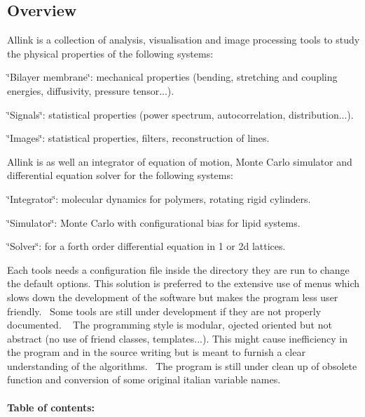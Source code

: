\hypertarget{index_Overview_section}{}\subsection{Overview}\label{index_Overview_section}
Allink is a collection of analysis, visualisation and image processing tools to study the physical properties of the following systems\+: 
\begin{DoxyItemize}
\item \char`\"{}\+Bilayer membrane\char`\"{}\+: mechanical properties (bending, stretching and coupling energies, diffusivity, pressure tensor...). 
\item \char`\"{}\+Signals\char`\"{}\+: statistical properties (power spectrum, autocorrelation, distribution...). 
\item \char`\"{}\+Images\char`\"{}\+: statistical properties, filters, reconstruction of lines. 
\end{DoxyItemize}Allink is as well an integrator of equation of motion, Monte Carlo simulator and differential equation solver for the following systems\+: 
\begin{DoxyItemize}
\item \char`\"{}\+Integrator\char`\"{}\+: molecular dynamics for polymers, rotating rigid cylinders. 
\item \char`\"{}\+Simulator\char`\"{}\+: Monte Carlo with configurational bias for lipid systems. 
\item \char`\"{}\+Solver\char`\"{}\+: for a forth order differential equation in 1 or 2d lattices. 
\end{DoxyItemize}Each tools needs a configuration file inside the directory they are run to change the default options. This solution is preferred to the extensive use of menus which slows down the development of the software but makes the program less user friendly.~\newline
 Some tools are still under development if they are not properly documented. ~\newline
 The programming style is modular, ojected oriented but not abstract (no use of friend classes, templates...). This might cause inefficiency in the program and in the source writing but is meant to furnish a clear understanding of the algorithms.~\newline
 The program is still under clean up of obsolete function and conversion of some original italian variable names. \paragraph*{Table of contents\+: }


